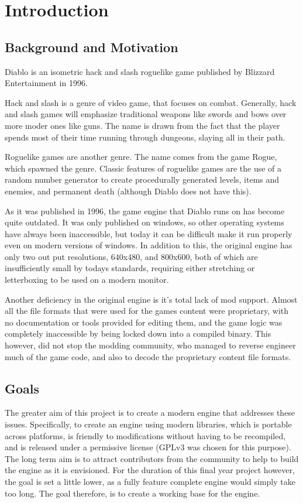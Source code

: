 \chapter{Introduction}
	\section{Background and Motivation}
	Diablo is an isometric hack and slash roguelike game published by Blizzard Entertainment in 1996\cite{diablo}.
	
	Hack and slash is a genre of video game, that focuses on combat. Generally, hack and slash games will emphasize   traditional weapons like swords and bows over more moder ones like guns. The name is drawn from the fact that the player spends most of their time running through dungeons, slaying all in their path.
	
	Roguelike games are another genre. The name comes from the game Rogue\cite{rogue}, which spawned the genre.
	Classic features of roguelike games are the use of a random number generator to create procedurally generated levels, items and enemies, and permanent death (although Diablo does not have this).
	
	As it was published in 1996, the game engine that Diablo runs on has become quite outdated. It was only published on windows, so other operating systems have always been inaccessible, but today it can be difficult make it run properly even on modern versions of windows.
	In addition to this, the original engine has only two out put resolutions, 640x480, and 800x600, both of which are insufficiently small by todays standards, requiring either stretching or letterboxing to be used on a modern monitor.
	
	Another deficiency in the original engine is it's total lack of mod support. Almost all the file formats that were used for the games content were proprietary, with no documentation or tools provided for editing them, and the game logic was completely inaccessible by being locked down into a compiled binary. This however, did not stop the modding community, who managed to reverse engineer much of the game code, and also to decode the proprietary content file formats.

	\section{Goals}	
	The greater aim of this project is to create a modern engine that addresses these issues. Specifically, to create an engine using modern libraries, which is portable across platforms, is friendly to modifications without having to be recompiled, and is released under a permissive license (GPLv3 was chosen for this purpose).
	The long term aim is to attract contributors from the community to help to build the engine as it is envisioned. For the duration of this final year project however, the goal is set a little lower, as a fully feature complete engine would simply take too long. The goal therefore, is to create a working base for the engine.
	
